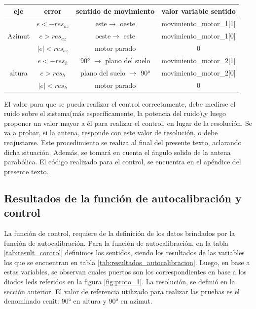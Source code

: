  \begin{table}[ht]
 	\centering 
 	\begin{tabular}{|c|c|c|c|}
 		\hline 
 		eje & error & sentido de movimiento & valor variable sentido \\ 
 		\hline	 
 		\multirow{3}{*}{Azimut}& $e<-res_{az}$ & este$\rightarrow$ oeste  &movimiento\_motor\_1[1] \\ \cline{2-4}
 		& $e>res_{az}$& oeste$\rightarrow$ este& movimiento\_motor\_1[0] \\ \cline{2-4}
 		& $|e|<res_{az}$& motor parado & 0\\ \cline{2-4}
 		\hline   
 		\multirow{3}{*}{altura}& $e<-res_h $ &90° $\rightarrow$ plano del suelo& movimiento\_motor\_2[1] \\ \cline{2-4}
 		& $e>res_h$ &plano del suelo $\rightarrow$ 90° & movimiento\_motor\_2[0] \\ \cline{2-4}
 		& $|e|<res_h$& motor parado& 0\\ 
 		\hline
 		  			
  	\end{tabular}
 \end{table}  
 
 El valor para que se pueda realizar el control correctamente, debe medirse el ruido sobre el sistema(más específicamente, la potencia del ruido),y luego proponer un valor mayor a él para realizar el control, en lugar de la resolución. Se va a probar, si la antena, responde con este valor de resolución, o debe reajustarse. Este procedimiento se realiza al final del presente texto, aclarando dicha situación. Además, se tomará en cuenta el ángulo solido de la antena parabólica. El código realizado para el control, se encuentra en el apéndice del presente texto. 

\subsection{Resultados de la función de autocalibración y control}

La función de control, requiere de la definición de los datos brindados por la función de autocalibración. Para la función de autocalibración, en la tabla \ref{tab:result_control} definimos los sentidos, siendo los resultados de las variables los que se encuentran en tabla \ref{tab:resultados_autocalibracion}. Luego, en base a estas variables, se observan cuales puertos son los correspondientes en base a los diodos leds referidos en la figura \ref{fig:proto_1}. La resolución, se definió en la sección anterior. El valor de referencia utilizado para realizar las pruebas es el denominado cenit: 90° en altura y 90° en azimut. 

